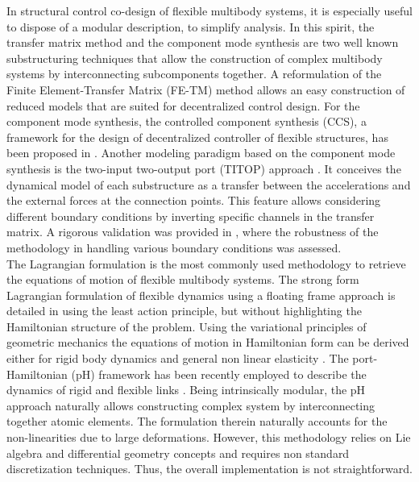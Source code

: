 In structural control co-design of flexible multibody systems, it is especially useful to dispose of a modular description, to simplify analysis. In this spirit, the transfer matrix method \cite{rong2010transfer} and the component mode synthesis \cite{hurty1965cms} are two well known substructuring techniques that allow the construction of complex multibody systems by interconnecting subcomponents together. A reformulation of the Finite Element-Transfer Matrix (FE-TM) method \cite{tan1990transfer} allows an easy construction of reduced models that are suited for decentralized control design. For the component mode synthesis, the controlled component synthesis (CCS), a framework for the design of decentralized controller of flexible structures, has been proposed in \cite{young1990}. Another modeling paradigm based on the component mode synthesis is the two-input two-output port (TITOP) approach \cite{alazard2015titop}. It conceives the dynamical model of each substructure as a transfer between the accelerations and the external forces at the connection points. This feature allows considering different boundary conditions by inverting specific channels in the transfer matrix. A rigorous validation was provided in \cite{perez2016flexible,sanfedino2018finite}, where the robustness of the methodology in handling various boundary conditions was assessed. \\

The Lagrangian formulation is the most commonly used methodology to retrieve the equations of motion of flexible multibody systems. The strong form Lagrangian formulation of flexible dynamics using a floating frame approach is detailed in  \cite[Eq. 4.10]{simeon2013computational} using the least action principle, but without highlighting the Hamiltonian structure of the problem.  Using the variational principles of geometric mechanics the equations of motion in Hamiltonian form can be derived either for rigid body dynamics \cite[Proposition 7.1.1]{holm2008geometric} and general non linear elasticity \cite[Chapter 3]{marsden1981lectures}. The port-Hamiltonian (pH) framework \cite{duindam2009} has been recently employed to describe the dynamics of rigid and flexible links \cite{macchelli2007link,macchelli2009multi}. Being intrinsically modular, the pH approach naturally allows constructing complex system by interconnecting together atomic elements. The formulation therein naturally accounts for the non-linearities due to large deformations.  However, this methodology relies on Lie algebra and differential geometry concepts and requires non standard discretization techniques. Thus, the overall implementation is not straightforward. \\

